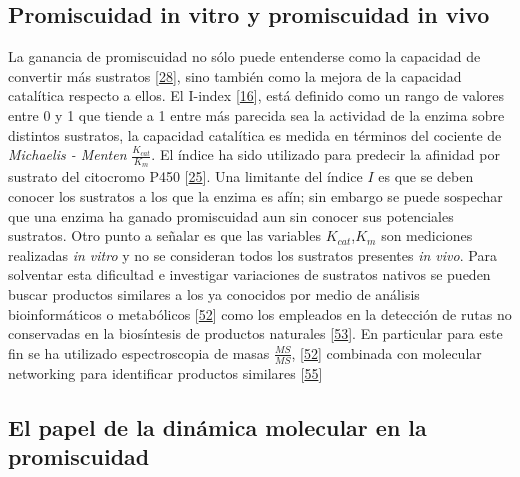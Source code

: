 \documentclass[12pt,twoside]{reedthesis}
\begin{document}
  \subsection{Promiscuidad in vitro y promiscuidad in
  vivo}\label{promiscuidad-in-vitro-y-promiscuidad-in-vivo}
  
  La ganancia de promiscuidad no sólo puede entenderse como la capacidad
  de convertir más sustratos
  {[}\protect\hyperlink{ref-carbonell_molecular_2010}{28}{]}, sino también
  como la mejora de la capacidad catalítica respecto a ellos. El I-index
  {[}\protect\hyperlink{ref-nath_quantitative_2008}{16}{]}, está definido
  como un rango de valores entre 0 y 1 que tiende a 1 entre más parecida
  sea la actividad de la enzima sobre distintos sustratos, la capacidad
  catalítica es medida en términos del cociente de \emph{Michaelis -
  Menten} \(\frac{K_{cat}}{K_m}\). El índice ha sido utilizado para
  predecir la afinidad por sustrato del citocromo P450
  {[}\protect\hyperlink{ref-nath_quantifying_2010}{25}{]}. Una limitante
  del índice \(I\) es que se deben conocer los sustratos a los que la
  enzima es afín; sin embargo se puede sospechar que una enzima ha ganado
  promiscuidad aun sin conocer sus potenciales sustratos. Otro punto a
  señalar es que las variables \(K_{cat}\),\(K_m\) son mediciones
  realizadas \emph{in vitro} y no se consideran todos los sustratos
  presentes \emph{in vivo}. Para solventar esta dificultad e investigar
  variaciones de sustratos nativos se pueden buscar productos similares a
  los ya conocidos por medio de análisis bioinformáticos o metabólicos
  {[}\protect\hyperlink{ref-nesvizhskii_analysis_2007}{52}{]} como los
  empleados en la detección de rutas no conservadas en la biosíntesis de
  productos naturales
  {[}\protect\hyperlink{ref-medema_computational_2015}{53}{]}. En
  particular para este fin se ha utilizado espectroscopia de masas
  \(\frac{MS}{MS}\),
  {[}\protect\hyperlink{ref-nesvizhskii_analysis_2007}{52}{]} combinada
  con molecular networking para identificar productos similares
  {[}\protect\hyperlink{ref-yang_molecular_2013}{55}{]}
  
  \subsection{El papel de la dinámica molecular en la
  promiscuidad}\label{el-papel-de-la-dinamica-molecular-en-la-promiscuidad}
  
\end{document}
